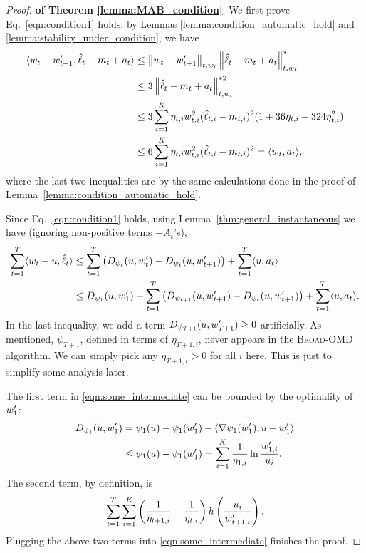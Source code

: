 \begin{proof}{\textbf{of Theorem \ref{lemma:MAB_condition}}.}
We first prove Eq.~\eqref{eqn:condition1} holds: by Lemmas \ref{lemma:condition_automatic_hold} %
and \ref{lemma:stability_under_condition}, we have
\begin{align*}
\langle {w_t-w_{t+1}^\prime, \hat{\ell}_t-m_t+ a_t} \rangle
&\leq \left\lVert w_t-w_{t+1}^\prime\right\rVert_{t,w_t}\left\lVert\hat{\ell}_t-m_t+a_t\right\rVert_{t,w_t}^*\\
&\leq 3\left\lVert\hat{\ell}_t-m_t+a_t\right\rVert_{t,w_t}^{*2}\\
&\leq 3\sum_{i=1}^K \eta_{t,i}w_{t,i}^2(\hat{\ell}_{t,i}-m_{t,i})^2(1+36\eta_{t,i}+324\eta_{t,i}^2) \\
&\leq 6\sum_{i=1}^K \eta_{t,i}w_{t,i}^2(\hat{\ell}_{t,i}-m_{t,i})^2 = \langle {w_t, a_t} \rangle,
\end{align*}
where the last two inequalities are by the same calculations done in the proof of Lemma~\ref{lemma:condition_automatic_hold}.

Since Eq.~\eqref{eqn:condition1} holds, using Lemma~\ref{thm:general_instantaneous} we have (ignoring non-positive terms $-A_t$'s),
\begin{align}
\sum_{t=1}^T\langle {w_t-u, \hat{\ell}_t} \rangle&\leq \sum_{t=1}^T\left(D_{\psi_t}(u,w_t^\prime)-D_{\psi_t}(u,w^\prime_{t+1})\right)+\sum_{t=1}^T\langle {u,a_t} \rangle\nonumber \\
&\leq D_{\psi_1}(u, w_1^\prime) + \sum_{t=1}^{T}\left( D_{\psi_{t+1}}(u, w^\prime_{t+1})-D_{\psi_{t}}(u, w^\prime_{t+1}) \right)+\sum_{t=1}^T\langle {u,a_t} \rangle.\label{eqn:some_intermediate}
\end{align}
In the last inequality, we add a term $D_{\psi_{T+1}}(u, w_{T+1}^\prime) \geq 0$ artificially. As mentioned, $\psi_{T+1}$, defined in terms of $\eta_{T+1,i}$, never appears in the \textsc{Broad-OMD} algorithm. We can simply pick any $\eta_{T+1,i} > 0$ for all $i$ here. This is just to simplify some analysis later. 

The first term in \eqref{eqn:some_intermediate} can be bounded by the optimality of $w_1^\prime$:
\begin{align*}
D_{\psi_1}(u, w_1^\prime)&=\psi_1(u)-\psi_1(w_1^\prime)-\langle {\nabla\psi_1(w_1^\prime), u-w_1^\prime} \rangle\\
&\leq \psi_1(u)-\psi_1(w_1^\prime)=\sum_{i=1}^K \frac{1}{\eta_{1,i}}\ln\frac{w_{1,i}^\prime}{u_i}.
\end{align*}
The second term, by definition, is
\begin{align*}
\sum_{t=1}^{T}\sum_{i=1}^K \left(\frac{1}{\eta_{t+1,i}}-\frac{1}{\eta_{t,i}}\right) h\left(\frac{u_i}{w_{t+1,i}^\prime}\right). 
\end{align*}
Plugging the above two terms into \eqref{eqn:some_intermediate} finishes the proof.
\end{proof}

